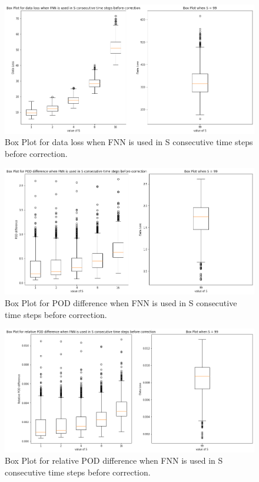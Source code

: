 \begin{figure}[H]
    \caption{Box Plot for data loss when FNN is used in S consecutive time steps before correction.}
    \includegraphics[scale=0.4]{figures/mantle_convection_images/further_testings/Data_Loss_boxplot.png}
\end{figure}

\begin{figure}[H]
    \caption{Box Plot for POD difference when FNN is used in S consecutive time steps before correction.}
    \includegraphics[scale=0.4]{figures/mantle_convection_images/further_testings/POD_boxplot.png}
\end{figure}

\begin{figure}[H]
    \caption{Box Plot for relative POD difference when FNN is used in S consecutive time steps before correction.}
    \includegraphics[scale=0.4]{figures/mantle_convection_images/further_testings/Relative_POD_boxplot.png}
\end{figure}

